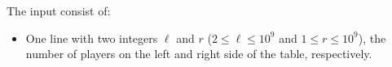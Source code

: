 
	The input consist of:
	\begin{itemize}
		\item One line with two integers $\ell$ and $r$ ($2 \leq \ell \leq 10^{9}$ and $1 \leq r \leq 10^{9}$), the number of players on the left and right side of the table, respectively.
	\end{itemize}

